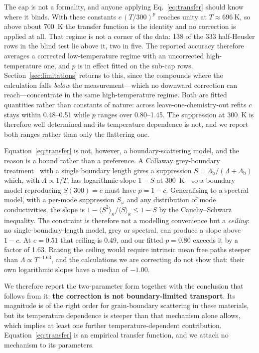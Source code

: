 The cap is not a formality, and anyone applying Eq.~\eqref{eq:transfer} should know where it binds.
With these constants $c\,(T/300)^{p}$ reaches unity at $T \approx \SI{696}{\kelvin}$, so above about
\SI{700}{\kelvin} the transfer function is the identity and no correction is applied at all. That
regime is not a corner of the data: \num{138} of the \num{333} half-Heusler rows in the blind test
lie above it, two in five. The reported accuracy therefore averages a corrected low-temperature
regime with an uncorrected high-temperature one, and $p$ is in effect fitted on the sub-cap rows.
Section~\ref{sec:limitations} returns to this, since the compounds where the calculation falls
\emph{below} the measurement---which no downward correction can reach---concentrate in the same
high-temperature regime. Both are fitted quantities
rather than constants of nature: across leave-one-chemistry-out refits $c$ stays within
\numrange{0.48}{0.51} while $p$ ranges over \numrange{0.80}{1.45}. The suppression at
\SI{300}{\kelvin} is therefore well determined and its temperature dependence is not, and we report
both ranges rather than only the flattering one.

Equation~\eqref{eq:transfer} is not, however, a boundary-scattering model, and the reason is a
bound rather than a preference. A Callaway grey-boundary
treatment~\cite{callaway1959model} with a single boundary length gives a suppression
$S = \Lambda_\mathrm{b}/(\Lambda+\Lambda_\mathrm{b})$ which, with $\Lambda \propto 1/T$, has
logarithmic slope $1-S$ at \SI{300}{\kelvin}---so a boundary model reproducing $S(300)=c$ must have
$p = 1-c$. Generalising to a spectral model, with a per-mode suppression $S_\omega$ and any
distribution of mode conductivities, the slope is
$1 - \langle S^2\rangle_\kappa/\langle S\rangle_\kappa \leq 1-\bar S$ by the Cauchy--Schwarz
inequality. The constraint is therefore not a modelling convenience but a \emph{ceiling}: no
single-boundary-length model, grey or spectral, can produce a slope above $1-c$. At $c=\num{0.51}$
that ceiling is \num{0.49}, and our fitted $p=\num{0.80}$ exceeds it by a factor of \num{1.63}.
Raising the ceiling would require intrinsic mean free paths steeper than
$\Lambda \propto T^{-1.63}$, and the calculations we are correcting do not show that: their own
logarithmic slopes have a median of $-1.00$.

We therefore report the two-parameter form together with the conclusion that follows from it:
\textbf{the correction is not boundary-limited transport}. Its magnitude is of the right order for
grain-boundary scattering in these materials, but its temperature dependence is steeper than that
mechanism alone allows, which implies at least one further temperature-dependent contribution.
Equation~\eqref{eq:transfer} is an empirical transfer function, and we attach no mechanism to its
parameters.

